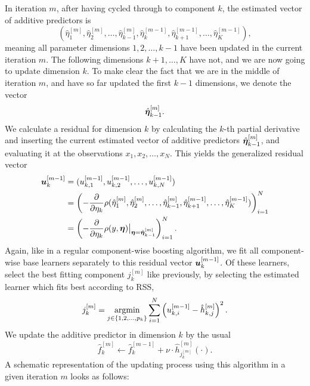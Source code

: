 In iteration $m$, after having cycled through to component $k$, the estimated vector of additive predictors is
\begin{equation*}
    \left(\hat{\eta}_1^{[m]},\hat{\eta}_2^{[m]},\ldots,\hat{\eta}_{k-1}^{[m]},\hat{\eta}_{k}^{[m-1]},\hat{\eta}_{k+1}^{[m-1]},\ldots,\hat{\eta}_{K}^{[m-1]}\right),
\end{equation*}
meaning all parameter dimensions $1,2,\ldots,k-1$ have been updated in the current iteration $m$.
The following dimensions $k+1,\ldots,K$ have not, and we are now going to update dimension $k$.
To make clear the fact that we are in the middle of iteration $m$, and have so far updated the first $k-1$ dimensions, we denote the vector
\begin{equation}
    \hat{\boldsymbol{\eta}}_{k-1}^{[m]}.
\end{equation}
We calculate a residual for dimension $k$ by calculating the $k$-th partial derivative and inserting the current estimated vector of additive predictors $\hat{\boldsymbol{\eta}}_{k-1}^{[m]}$, and evaluating it at the observations $x_1,x_2,\ldots,x_N$. This yields the generalized residual vector
\begin{align*}
    \bm{u}_k^{[m-1]}&=(u_{k,1}^{[m-1]},u_{k,2}^{[m-1]},\ldots,u_{k,N}^{[m-1]})\\
    &=\left(-\frac{\partial}{\partial \eta_k}\rho(\hat{\eta}_1^{[m]},\hat{\eta}_2^{[m]},\ldots,\hat{\eta}_{k-1}^{[m]},\hat{\eta}_{k+1}^{[m-1]},\ldots,\hat{\eta}_{K}^{[m-1]})\right)_{i=1}^N \\
    &=\left(-\frac{\partial}{\partial \eta_k}\rho(y,\boldsymbol{\eta})\big\rvert_{\boldsymbol{\eta}=\hat{\boldsymbol{\eta}}_{k-1}^{[m]}}\right)_{i=1}^N.
\end{align*}
Again, like in a regular component-wise boosting algorithm, we fit all component-wise base learners separately to this residual vector $\bm{u}_k^{[m-1]}$. Of these learners, select the best fitting component $j_k^{[m]}$ like previously, by selecting the
estimated learner which fits best according to RSS,
\begin{equation}
    j_k^{[m]}=\operatorname*{argmin}_{j\in\{1,2,\ldots,p_k\}}\sum_{i=1}^N \left(u_{k,i}^{[m-1]}-\hat{h}_{k,j}^{[m]}\right)^2.
\end{equation}
We update the additive predictor in dimension $k$ by the usual
\begin{equation}
    \hat{f}_k^{[m]}\gets\hat{f}_k^{[m-1]}+\nu\cdot \hat{h}^{[m]}_{j_k^{[m]}}(\cdot).
\end{equation}
A schematic representation of the updating process using this algorithm in a given iteration $m$ looks as follows:
